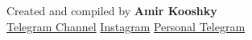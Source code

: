 \documentclass[11pt]{article}
\begin{document}
\vfill
\begin{center}
\small\color{Muted} Created and compiled by \textbf{Amir Kooshky}\\
\href{https://t.me/KooshkyTOEFL}{Telegram Channel}\quad\textbullet\quad
\href{https://www.instagram.com/kooshkytoefl}{Instagram}\quad\textbullet\quad
\href{https://t.me/KooshkyTOEFL\_pv}{Personal Telegram}
\end{center}
\end{document}
